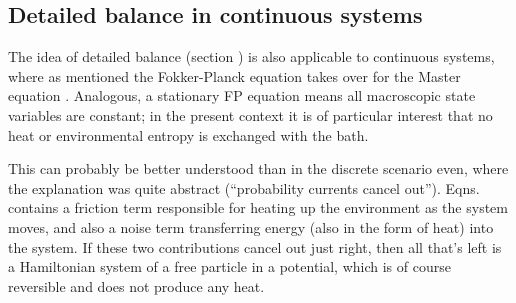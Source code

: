 \subsection{Detailed balance in continuous systems}

The idea of detailed balance (section ) is also applicable to continuous systems, where as mentioned the Fokker-Planck equation  takes over for the Master equation . Analogous, a stationary FP equation means all macroscopic state variables are constant; in the present context it is of particular interest that no heat or environmental entropy is exchanged with the bath.

This can probably be better understood than in the discrete scenario even, where the explanation was quite abstract (``probability currents cancel out''). Eqns.  contains a friction term responsible for heating up the environment as the system moves, and also a noise term transferring energy (also in the form of heat) into the system. If these two contributions cancel out just right, then all that's left is a Hamiltonian system of a free particle in a potential, which is of course reversible and does not produce any heat.

